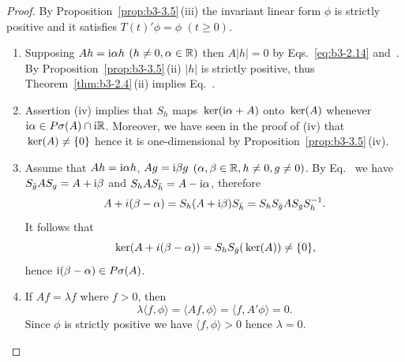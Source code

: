 \begin{proof}
	By Proposition~\ref{prop:b3-3.5}\,(iii) the invariant linear form $\phi$ is strictly positive and it satisfies $T(t)'\phi = \phi$ $(t \geq 0)$.
	\begin{enumerate}[wide, labelindent=.25em]
	\item[(iv)] 
	Supposing $Ah = \mathrm{i}\alpha h$ $(h \neq 0, \alpha \in \mathbb{R})$ then $A|h| = 0$ by Eqs.~\eqref{eq:b3-2.14} and~.
	By Proposition~\ref{prop:b3-3.5}\,(ii) $|h|$ is strictly positive, thus Theorem~\ref{thm:b3-2.4}\,(ii) implies Eq.~.
	
	\item[(ii)] 
	Assertion (iv) implies that $S_{h}$ maps $\mathop{}\mathrm{ker}(\mathrm{i}\alpha + A)$ onto $\mathop{}\mathrm{ker}(A)$ whenever $\mathrm{i} \alpha \in P\sigma(A)\cap \mathrm{i}\mathbb{R}$.
	Moreover, we have seen in the proof of (iv) that $\mathop{}\mathrm{ker}(A) \neq \{0\}$ hence it is one-dimensional by Proposition~\ref{prop:b3-3.5}\,(iv).
	
	\item[(i)] 
	Assume that $Ah = \mathrm{i}\alpha h$, $Ag = \mathrm{i}\beta g$ $(\alpha,\beta \in \mathbb{R}, h \neq 0, g \neq 0)$.
	By Eq.~ we have $S_{\bar{g}}A S_{g} = A + \mathrm{i}\beta$ and $S_{h}A S_{\bar{h}} = A - \mathrm{i}\alpha$, therefore
	\begin{equation}\label{eq:b3-3.6}
	A + i(\beta - \alpha) = S_{h}(A + \mathrm{i}\beta)S_{\bar{h}} = S_{h}S_{\bar{g}}A S_{g}S_{h}^{-1}.
	\end{equation}
	It follows that 
    \[%
    \Kern{A + i(\beta - \alpha)} = S_{h}S_{\bar{g}}(\Kern{A}) \neq \{0\} , 
    \]
    hence $\mathrm{i} (\beta - \alpha) \in P\sigma(A)$.
	
	\item[(v)] 
	If\/ $Af = \lambda f$ where $f > 0$, then
	\begin{equation}\label{eq:b3-3.7}
	\lambda\langle f,\phi\rangle = \langle Af,\phi\rangle = \langle f,A'\phi\rangle = 0.
	\end{equation}
	Since $\phi$ is strictly positive we have $\langle f,\phi\rangle > 0$ hence $\lambda = 0$.
	

\end{enumerate}
\end{proof}
